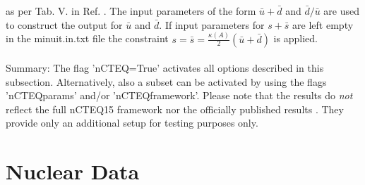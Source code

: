 \documentclass{article}
\begin{document}
\noindent as per Tab. V. in Ref. \cite{Kovarik:2015cma}. The input parameters of the form $\bar{u}+\bar{d}$ and $\bar{d}/\bar{u}$ are used to construct the output for $\bar{u}$ and $\bar{d}$. If input parameters for $s+\bar{s}$ are left empty in the minuit.in.txt file the constraint $s=\bar{s}=\frac{\kappa(A)}{2} \left( \bar{u}+\bar{d} \right)$ is applied. \\
\\
Summary:  The flag 'nCTEQ=True' activates all options described in this subsection. Alternatively, also a subset can be activated by using the flags 'nCTEQparams' and/or 'nCTEQframework'. Please note that the results do \textit{not} reflect the full nCTEQ15 framework nor the officially published results \cite{Kovarik:2015cma}. They provide only an additional setup for testing purposes only.


\section{Nuclear Data}
\label{sec-nucldata}
\end{document}
